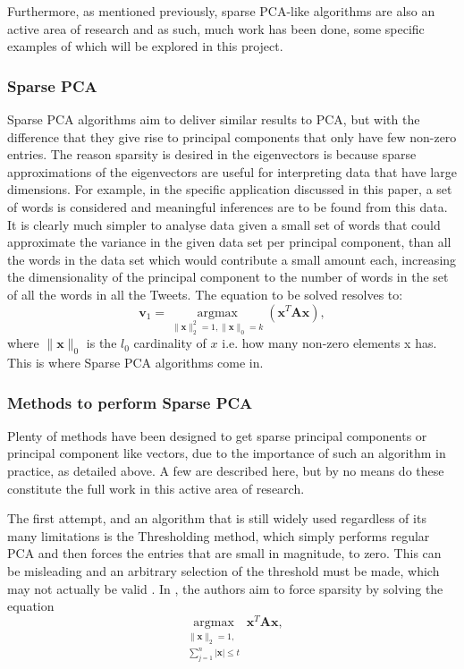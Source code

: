 \documentclass[11pt,a4paper]{article}
\begin{document}
Furthermore, as mentioned previously, sparse PCA-like algorithms are also an active area of research and as such, much work has been done, some specific examples of which will be explored in this project.

\subsubsection{Sparse PCA}

Sparse PCA algorithms aim to deliver similar results to PCA, but with the difference that they give rise to principal components that only have few non-zero entries. The reason sparsity is desired in the eigenvectors is because sparse approximations of the eigenvectors are useful for interpreting data that have large dimensions. For example, in the specific application discussed in this paper, a set of words is considered and meaningful inferences are to be found from this data. It is clearly much simpler to analyse data given a small set of words that could approximate the variance in the given data set per principal component, than all the words in the data set which would contribute a small amount each, increasing the dimensionality of the principal component to the number of words in the set of all the words in all the Tweets. The equation to be solved resolves to:
\begin{equation}
\mathbf{v}_1 = \underset{\|\mathbf{x}\|_2^2 = 1, \|\mathbf{x}\|_0 = k}{\operatorname{argmax}}\left( \mathbf{x}^T\mathbf{A}\mathbf{x}\right),
\end{equation}
where $\|\mathbf{x}\|_0$ is the $l_0$ cardinality of $x$ i.e. how many non-zero elements x has. This is where Sparse PCA algorithms come in. 

\subsubsection{Methods to perform Sparse PCA}
Plenty of methods have been designed to get sparse principal components or principal component like vectors, due to the importance of such an algorithm in practice, as detailed above. A few are described here, but by no means do these constitute the full work in this active area of research.

The first attempt, and an algorithm that is still widely used regardless of its many limitations is the Thresholding method, which simply performs regular PCA and then forces the entries that are small in magnitude, to zero. This can be misleading and an arbitrary selection of the threshold must be made, which may not actually be valid \cite{cadima}. In \cite{scotlass}, the authors aim to force sparsity by solving the equation
\begin{equation*}
\underset{\substack{\|\mathbf{x}\|_2 = 1, \\ \sum_{j=1}^n|\mathbf{x}| \leq t}}
{\operatorname{argmax}}\mathbf{x}^T\mathbf{A}\mathbf{x},
\end{equation*}
 
\end{document}
